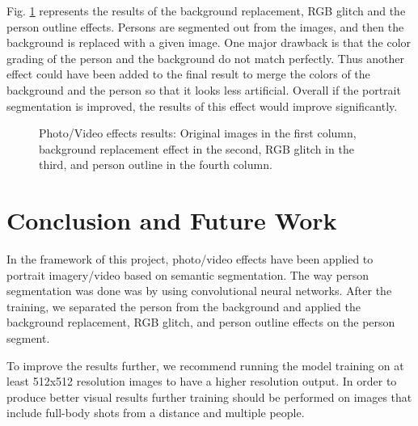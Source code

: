 \documentclass[english]{sbrt}
\begin{document}
Fig. \ref{fig:fig7} represents the results of the background replacement, RGB glitch and the person outline effects. Persons are segmented out from the images, and then the background is replaced with a given image. One major drawback is that the color grading of the person and the background do not match perfectly. Thus another effect could have been added to the final result to merge the colors of the background and the person so that it looks less artificial. Overall if the portrait segmentation is improved, the results of this effect would improve significantly.

\begin{figure}[hbt]
\centering 
{}
\caption{\label{fig:fig7} Photo/Video effects results: Original images in the first column, background replacement effect in the second, RGB glitch in the third, and person outline in the fourth column.}
\end{figure}


\section{Conclusion and Future Work}
In the framework of this project, photo/video effects have been applied to portrait imagery/video based on semantic segmentation. The way person segmentation was done was by using convolutional neural networks. After the training, we separated the person from the background and applied the background replacement, RGB glitch, and person outline effects on the person segment. 

To improve the results further, we recommend running the model training on at least 512x512 resolution images to have a higher resolution output. In order to produce better visual results further training should be performed on images that include full-body shots from a distance and multiple people. 
\clearpage
\printbibliography
\end{document}
